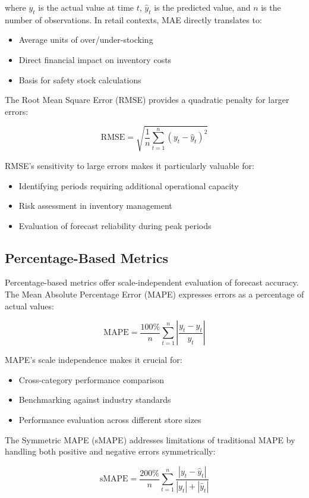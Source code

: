 \documentclass[12pt,a4paper]{report}
\begin{document}
where \(y_t\) is the actual value at time \(t\), \(\hat{y}_t\) is the predicted value, and \(n\) is the number of observations. In retail contexts, MAE directly translates to:
\begin{itemize}
    \item Average units of over/under-stocking
    \item Direct financial impact on inventory costs
    \item Basis for safety stock calculations
\end{itemize}

The Root Mean Square Error (RMSE) provides a quadratic penalty for larger errors:

\[
\text{RMSE} = \sqrt{\frac{1}{n} \sum_{t=1}^{n} (y_t - \hat{y}_t)^2}
\]

RMSE's sensitivity to large errors makes it particularly valuable for:
\begin{itemize}
    \item Identifying periods requiring additional operational capacity
    \item Risk assessment in inventory management
    \item Evaluation of forecast reliability during peak periods
\end{itemize}

\subsection{Percentage-Based Metrics}

Percentage-based metrics offer scale-independent evaluation of forecast accuracy. The Mean Absolute Percentage Error (MAPE) expresses errors as a percentage of actual values:

\[
\text{MAPE} = \frac{100\%}{n} \sum_{t=1}^{n} \left|\frac{y_t - \hat{y}_t}{y_t}\right|
\]

MAPE's scale independence makes it crucial for:
\begin{itemize}
    \item Cross-category performance comparison
    \item Benchmarking against industry standards
    \item Performance evaluation across different store sizes
\end{itemize}

The Symmetric MAPE (sMAPE) addresses limitations of traditional MAPE by handling both positive and negative errors symmetrically:

\[
\text{sMAPE} = \frac{200\%}{n} \sum_{t=1}^{n} \frac{|y_t - \hat{y}_t|}{|y_t| + |\hat{y}_t|}
\]
\end{document}
